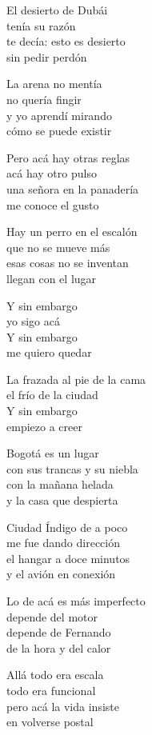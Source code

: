 \begin{lyrics}
El desierto de Dubái\\
tenía su razón\\
te decía: esto es desierto\\
sin pedir perdón

La arena no mentía\\
no quería fingir\\
y yo aprendí mirando\\
cómo se puede existir

Pero acá hay otras reglas\\
acá hay otro pulso\\
una señora en la panadería\\
me conoce el gusto

Hay un perro en el escalón\\
que no se mueve más\\
esas cosas no se inventan\\
llegan con el lugar

Y sin embargo\\
yo sigo acá\\
Y sin embargo\\
me quiero quedar

La frazada al pie de la cama\\
el frío de la ciudad\\
Y sin embargo\\
empiezo a creer

Bogotá es un lugar\\
con sus trancas y su niebla\\
con la mañana helada\\
y la casa que despierta

Ciudad Índigo de a poco\\
me fue dando dirección\\
el hangar a doce minutos\\
y el avión en conexión

Lo de acá es más imperfecto\\
depende del motor\\
depende de Fernando\\
de la hora y del calor

Allá todo era escala\\
todo era funcional\\
pero acá la vida insiste\\
en volverse postal


\end{lyrics}
